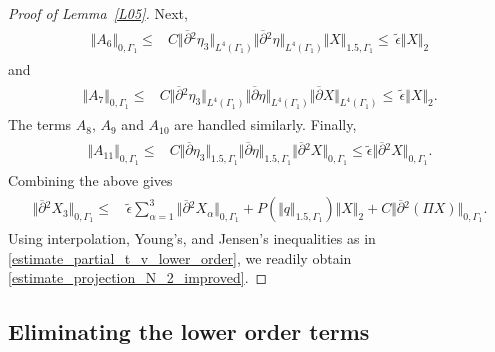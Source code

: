 \documentclass[10pt,reqno]{amsart}
\theoremstyle{plain}
\theoremstyle{definition}
\numberwithin{equation}{section}
\newcommand{\al}{\alpha}
\newcommand{\Ga}{\Gamma}
\newcommand{\norm}[1]{\Vert#1\Vert}
\begin{document}
{{{\begin{proof}[Proof of Lemma~\ref{L05}]
Next,
\begin{align}
\begin{split}
\norm{ A_6}_{0,\Gamma_1} \leq & C \norm{ \overline{\partial}{}^2 \eta_3 }_{L^4(\Ga_1)}
\norm{ \overline{\partial}{}^2 \eta}_{L^4(\Ga_1)} \norm{X}_{1.5,\Ga_1} 
\leq   \, \widetilde{\epsilon} \norm{X}_2
\end{split}
\nonumber
\end{align}
and 
\begin{align}
\begin{split}
\norm{ A_7}_{0,\Gamma_1} \leq & C \norm{ \overline{\partial}{}^2 \eta_3 }_{L^4(\Ga_1)}
\norm{ \overline{\partial}{} \eta}_{L^4(\Ga_1)} \norm{\overline{\partial}X}_{L^4(\Ga_1)} 
\leq   \, \widetilde{\epsilon} \norm{ X}_2.
\end{split}
\nonumber
\end{align}
The terms $A_8$, $A_9$ and $A_{10}$ are handled similarly. Finally,
\begin{align}
\begin{split}
\norm{ A_{11} }_{0,\Ga_1} \leq & C \norm{ \overline{\partial} \eta_3 }_{1.5,\Ga_1}
 \norm{ \overline{\partial} \eta }_{1.5,\Ga_1} \norm{ \overline{\partial}{}^2 X }_{0,\Ga_1}
 \leq  \widetilde{\epsilon} \norm{ \overline{\partial}{}^2 X }_{0,\Ga_1}.
\end{split}
\nonumber
\end{align}
Combining the above gives 
\begin{align}
\begin{split}
\norm{ \overline{\partial}{}^2 X_3 }_{0,\Ga_1}
\leq 
& 
\, \widetilde{\epsilon} 
\sum_{\al=1}^3 \norm{ \overline{\partial}{}^2 X_\al }_{0,\Ga_1}
+
P(\norm{q}_{1.5,\Ga_1} ) \norm{  X }_{2} 
+
C\norm{\overline{\partial}{}^2( \Pi X )}_{0,\Ga_1}.
\end{split}
\label{estimate_projection_N_2}
\end{align} 
Using interpolation, Young's, and Jensen's inequalities
as in 
\eqref{estimate_partial_t_v_lower_order},
we readily
obtain 
\eqref{estimate_projection_N_2_improved}.
\end{proof}



\subsection{Eliminating the lower order terms\label{section_eliminating_lower_order}}

}}}
\end{document}
